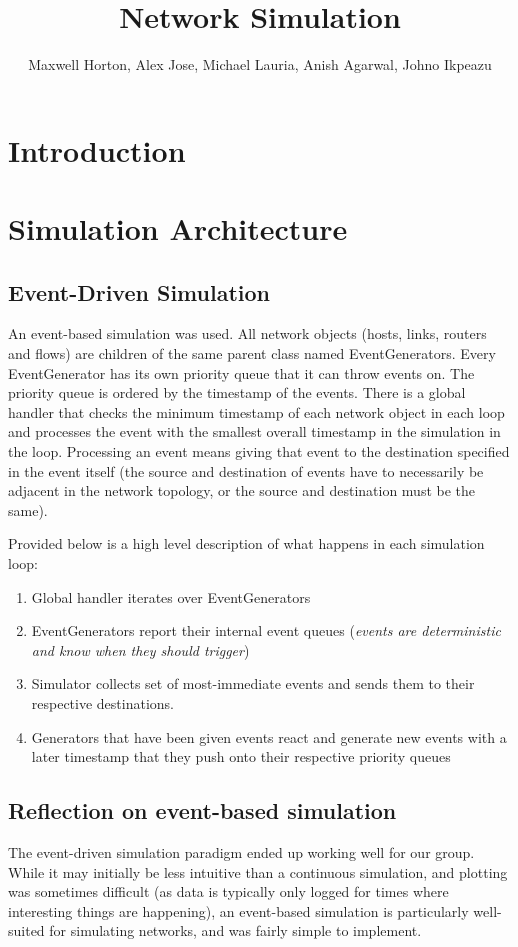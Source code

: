 \documentclass[12pt]{article}
\begin{document}
\title{Network Simulation}
\author{Maxwell Horton, Alex Jose, Michael Lauria, Anish Agarwal, Johno Ikpeazu}


\maketitle
\noindent
\tableofcontents
\newpage
\section{Introduction}

\section{Simulation Architecture}

\subsection{Event-Driven Simulation}
An event-based simulation was used. All network objects (hosts, links, routers and flows) are children of the same parent class named EventGenerators. Every EventGenerator has its own priority queue that it can throw events on. The priority queue is ordered by the timestamp of the events. There is a global handler that checks the minimum timestamp of each network object in each loop and processes the event with the smallest overall timestamp in the simulation in the loop. Processing an event means giving that event to the destination specified in the event itself (the source and destination of events have to necessarily be adjacent in the network topology, or the source and destination must be the same). 

Provided below is a high level description of what happens in each simulation loop:
\begin{enumerate}
\item Global handler iterates over EventGenerators
\item EventGenerators report their internal event queues (\emph{events are deterministic and know when they should trigger})
\item Simulator collects set of most-immediate events and sends them to their respective destinations.
\item Generators that have been given events react and generate new events with a later timestamp that they push onto their respective priority queues
\end{enumerate}

\subsection*{Reflection on event-based simulation}
The event-driven simulation paradigm ended up working well for our group. While it may initially be less intuitive than a continuous simulation, and plotting was sometimes difficult (as data is typically only logged for times where interesting things are happening), an event-based simulation is particularly well-suited for simulating networks, and was fairly simple to implement.
\end{document}

